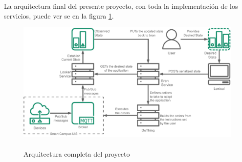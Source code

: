 La arquitectura final del presente proyecto, con toda la implementación de los servicios, puede ver se en la figura \ref{fig:StarDuckFinal}.


\begin{figure}[ht]
    \centering
    \caption{\\Arquitectura completa del proyecto}
    \label{fig:StarDuckFinal}
    \includegraphics[width=\linewidth]{images/StarDuckFinal.pdf}
\end{figure}